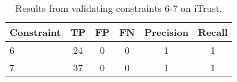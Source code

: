 \begin{table}
\begin{center}
\begin{tabular}{lccccc}
\hline
\textbf{Constraint} & \textbf{TP} & \textbf{FP} & \textbf{FN} & \textbf{Precision} & \textbf{Recall} \\
\hline
6 & 24 & 0 & 0 & 1 & 1\\
\rowcolor{RowColor}
7 & 37 & 0 & 0 & 1 & 1\\
\hline
\end{tabular}
\end{center}
\caption{Results from validating constraints 6-7 on iTrust.}
\label{tab:tool_extension}
\end{table}
